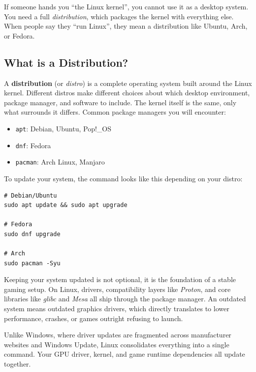 \documentclass{article}
\newcommand{\code}[1]{\colorbox{codebg}{\texttt{#1}}}
\begin{document}
\begin{tcolorbox}[arc=12pt, outer arc=10pt, 
colback=blue!4!white, colframe=blue!40!black, title=\textbf{Kernel $\neq$ OS}]
 If someone hands you ``the Linux kernel'', you cannot use it as a desktop system. You need a full \textit{distribution}, which packages the kernel with everything else. When people say they ``run Linux'', they mean a distribution like Ubuntu, Arch, or Fedora.
\end{tcolorbox}

\subsection{What is a Distribution?}

A \textbf{distribution} (or \textit{distro}) is a complete operating system built around the Linux kernel. Different distros make different choices about which desktop environment, package manager, and software to include. The kernel itself is the same, only what surrounds it differs. Common package managers you will encounter:

\begin{itemize}[leftmargin=1.5em, nosep, label={\tiny\textbullet}]
  \item \code{apt}: Debian, Ubuntu, Pop!\_OS
  \item \code{dnf}: Fedora
  \item \code{pacman}: Arch Linux, Manjaro
\end{itemize}

\noindent To update your system, the command looks like this depending on your distro:

\begin{verbatim}
# Debian/Ubuntu
sudo apt update && sudo apt upgrade

# Fedora
sudo dnf upgrade

# Arch
sudo pacman -Syu

\end{verbatim}

\noindent Keeping your system updated is not optional, it is the foundation of a stable gaming setup. On Linux, drivers, compatibility layers like \textit{Proton}, and core libraries like \textit{glibc} and \textit{Mesa} all ship through the package manager. An outdated system means outdated graphics drivers, which directly translates to lower performance, crashes, or games outright refusing to launch.

Unlike Windows, where driver updates are fragmented across manufacturer websites and Windows Update, Linux consolidates everything into a single command. Your GPU driver, kernel, and game runtime dependencies all update together.
\end{document}
